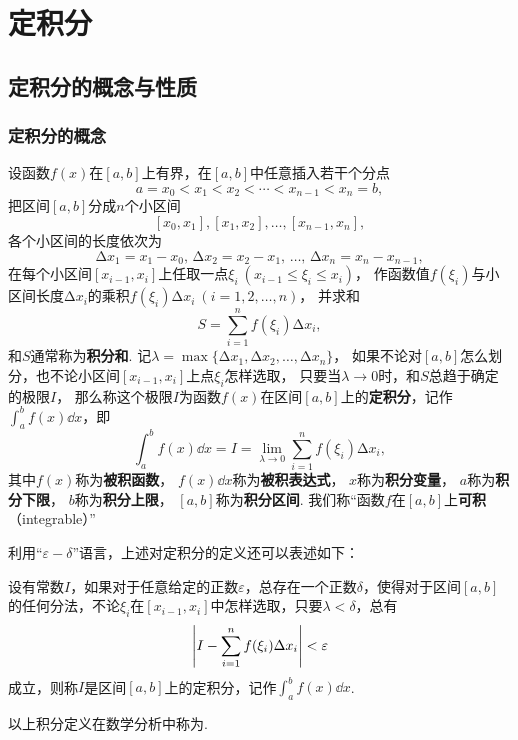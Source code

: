 \chapter{定积分}
\section{定积分的概念与性质}
\subsection{定积分的概念}
\begin{definition}
设函数\(f(x)\)在\([a,b]\)上有界，在\([a,b]\)中任意插入若干个分点\[
a=x_0 < x_1 < x_2 < \dotsb < x_{n-1} < x_n = b,
\]把区间\([a,b]\)分成\(n\)个小区间\[
[x_0,x_1],[x_1,x_2],\dotsc,[x_{n-1},x_n],
\]各个小区间的长度依次为\[
\increment x_1=x_1-x_0,\,\increment x_2=x_2-x_1,\,\dotsc,\,\increment x_n=x_n-x_{n-1},
\]
在每个小区间\([x_{i-1},x_i]\)上任取一点\(\xi_i\ (x_{i-1} \leqslant \xi_i \leqslant x_i)\)，%
作函数值\(f(\xi_i)\)与小区间长度\(\increment x_i\)的乘积\(f(\xi_i)\increment x_i\ (i=1,2,\dotsc,n)\)，%
并求和\[
S = \sum\limits_{i=1}^n f(\xi_i) \increment x_i,
\]
和\(S\)通常称为\textbf{积分和}.
记\(\lambda=\max\{\increment x_1,\increment x_2,\dotsc,\increment x_n\}\)，%
如果不论对\([a,b]\)怎么划分，也不论小区间\([x_{i-1},x_i]\)上点\(\xi_i\)怎样选取，%
只要当\(\lambda\to0\)时，和\(S\)总趋于确定的极限\(I\)，%
那么称这个极限\(I\)为函数\(f(x)\)在区间\([a,b]\)上的\textbf{定积分}，记作\(\int_a^b f(x) \dd{x}\)，即
\begin{equation}
\int_a^b f(x) \dd{x}
= I
= \lim\limits_{\lambda\to0} \sum\limits_{i=1}^n f(\xi_i)\increment x_i,
\end{equation}
其中\(f(x)\)称为\textbf{被积函数}，%
\(f(x)\dd{x}\)称为\textbf{被积表达式}，%
\(x\)称为\textbf{积分变量}，%
\(a\)称为\textbf{积分下限}，%
\(b\)称为\textbf{积分上限}，%
\([a,b]\)称为\textbf{积分区间}.
我们称“函数\(f\)在\([a,b]\)上\textbf{可积}（integrable）”
\end{definition}

利用“\(\varepsilon-\delta\)”语言，上述对定积分的定义还可以表述如下：

设有常数\(I\)，如果对于任意给定的正数\(\varepsilon\)，总存在一个正数\(\delta\)，使得对于区间\([a,b]\)的任何分法，不论\(\xi_i\)在\([x_{i-1},x_i]\)中怎样选取，只要\(\lambda<\delta\)，总有\[
\abs{I - \sum\limits_{i=1}^n f(\xi_i) \Delta x_i}<\varepsilon
\]成立，则称\(I\)是区间\([a,b]\)上的定积分，记作\(\int_a^b f(x) \dd{x}\).

以上积分定义在数学分析中称为.

